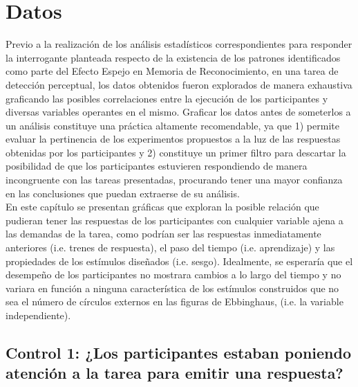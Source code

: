 
\chapter{Datos} %

\label{Cap_Data} %


Previo a la realización de los análisis estadísticos correspondientes para responder la interrogante planteada respecto de la existencia de los patrones identificados como parte del Efecto Espejo en Memoria de Reconocimiento, en una tarea de detección perceptual, los datos obtenidos fueron explorados de manera exhaustiva graficando las posibles correlaciones entre la ejecución de los participantes y diversas variables operantes en el mismo. Graficar los datos antes de someterlos a un análisis constituye una práctica altamente recomendable, ya que 1) permite evaluar la pertinencia de los experimentos propuestos a la luz de las respuestas obtenidas por los participantes y 2) constituye un primer filtro para descartar la posibilidad de que los participantes estuvieren respondiendo de manera incongruente con las tareas presentadas, procurando tener una mayor confianza en las conclusiones que puedan extraerse de su análisis.\\

En este capítulo se presentan gráficas que exploran la posible relación que pudieran tener las respuestas de los participantes con cualquier variable ajena a las demandas de la tarea, como podrían ser las respuestas inmediatamente anteriores (i.e. trenes de respuesta), el paso del tiempo (i.e. aprendizaje) y las propiedades de los estímulos diseñados (i.e. sesgo). Idealmente, se esperaría que el desempeño de los participantes no mostrara cambios a lo largo del tiempo y no variara en función a ninguna característica de los estímulos construidos que no sea el número de círculos externos en las figuras de Ebbinghaus, (i.e. la variable independiente).\\









\section{Control 1: ¿Los participantes estaban poniendo atención a la tarea para emitir una respuesta?}

